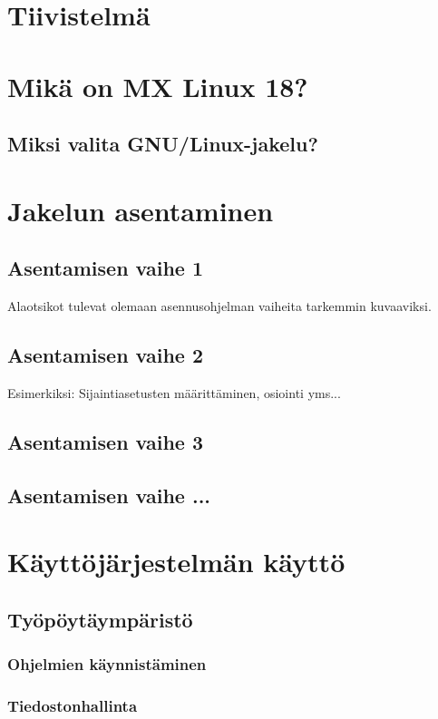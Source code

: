 \documentclass[a4paper, 12pt, finnish]{article}
\begin{document}
\thispagestyle{empty} %
\section{Tiivistelmä}

\section{Mikä on MX Linux 18?}
\subsection{Miksi valita GNU/Linux-jakelu?}

\section{Jakelun asentaminen}
\subsection{Asentamisen vaihe 1}
Alaotsikot tulevat olemaan asennusohjelman vaiheita tarkemmin kuvaaviksi.
\subsection{Asentamisen vaihe 2}
Esimerkiksi: Sijaintiasetusten määrittäminen, osiointi yms...
\subsection{Asentamisen vaihe 3}
\subsection{Asentamisen vaihe ...}

\section{Käyttöjärjestelmän käyttö}

\subsection{Työpöytäympäristö}

\subsubsection{Ohjelmien käynnistäminen}

\subsubsection{Tiedostonhallinta}
\end{document}
